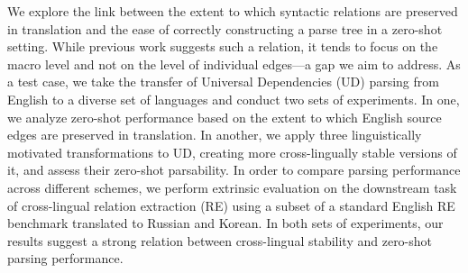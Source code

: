 We explore the link between the extent to which syntactic relations are preserved in translation and the ease of correctly constructing a parse tree in a zero-shot setting. While previous work suggests such a relation, it tends to focus on the macro level and not on the level of individual edges---a gap we aim to address. As a test case, we take the transfer of Universal Dependencies (UD) parsing from English to a diverse set of languages and conduct two sets of experiments. In one, we analyze zero-shot performance based on the extent to which English source edges are preserved in translation. In another, we apply three linguistically motivated transformations to UD, creating more cross-lingually stable versions of it, and assess their zero-shot parsability. In order to compare parsing performance across different schemes, we perform extrinsic evaluation on the downstream task of cross-lingual relation extraction (RE) using a subset of a standard English RE benchmark translated to Russian and Korean. In both sets of experiments, our results suggest a strong relation between cross-lingual stability and zero-shot parsing performance.
